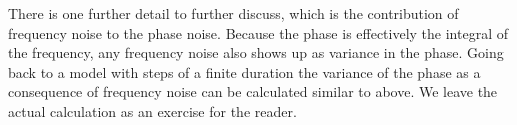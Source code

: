 \documentclass{article}
\begin{document}
There is one further detail to further discuss, which is the contribution of frequency noise to the phase noise. Because the phase is effectively the integral of the frequency, any frequency noise also shows up as variance in the phase. Going back to a model with steps of a finite duration the variance of the phase as a consequence of frequency noise can be calculated similar to above. We leave the actual calculation as an exercise for the reader.
\end{document}
